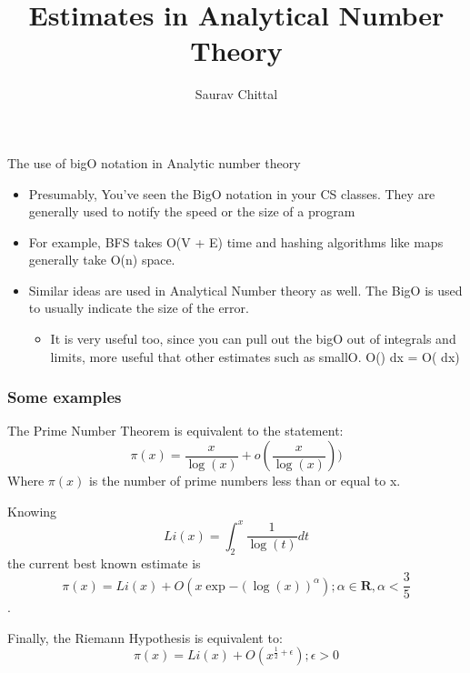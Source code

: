 \documentclass[aspectratio=169, handout]{beamer}
\title{Estimates in Analytical Number Theory}
\author{Saurav Chittal}
\date{}
\begin{document}

\begin{frame}
\titlepage
\end{frame}

\begin{frame}{The use of bigO notation in Analytic number theory}
    \begin{itemize}
        \item Presumably, You've seen the BigO notation in your CS classes. They are generally used to notify the speed or the size of a program \pause
        \item For example, BFS takes O(V + E) time and hashing algorithms like maps generally take O(n) space.\pause
        \item Similar ideas are used in Analytical Number theory as well. The BigO is used to usually indicate the size of the error. 
        \begin{itemize}
            \item It is very useful too, since you can pull out the bigO out of integrals and limits, more useful that other estimates such as smallO.
            \int O() dx = O(\int {} dx)
        \end{itemize}
    \end{itemize}
\end{frame}


\begin{frame}
  \frametitle{Some examples}
  The Prime Number Theorem is equivalent to the statement:
  $$\pi(x) = \frac{x}{\log(x)} + o(\frac{x}{\log(x)}))$$
  Where $\pi(x)$ is the number of prime numbers less than or equal to x.\pause

  Knowing $$Li(x) = \int_2^x \frac{1}{\log(t)} dt$$ the current best known estimate is $$\pi(x) = Li(x) + O(x\exp{-(\log(x))^\alpha}); \alpha \in \mathbf{R}, \alpha < \frac{3}{5}$$. \pause

  Finally, the Riemann Hypothesis is equivalent to:
  $$\pi(x) = Li(x) + O(x^{\frac{1}{2} + \epsilon}); \epsilon > 0$$
\end{frame}
\end{document}
